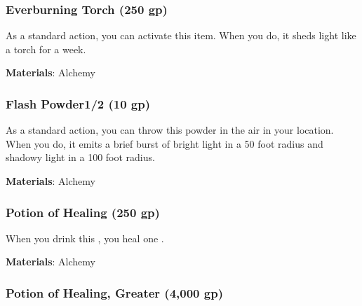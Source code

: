 \lowercase{\hypertarget{item:Everburning Torch}{}}\label{item:Everburning Torch}
\hypertarget{item:Everburning Torch}{\subsubsection{Everburning Torch\hfill{} (250 gp)}}

As a standard action, you can activate this item.
When you do, it sheds light like a torch for a week.



\vspace{0.25em}
\textbf{Materials}: Alchemy


\lowercase{\hypertarget{item:Flash Powder}{}}\label{item:Flash Powder}
\hypertarget{item:Flash Powder}{\subsubsection{Flash Powder\hfill1/2 (10 gp)}}

As a standard action, you can throw this powder in the air in your location.
When you do, it emits a brief burst of bright light in a 50 foot radius and shadowy light in a 100 foot radius.



\vspace{0.25em}
\textbf{Materials}: Alchemy


\lowercase{\hypertarget{item:Potion of Healing}{}}\label{item:Potion of Healing}
\hypertarget{item:Potion of Healing}{\subsubsection{Potion of Healing\hfill{} (250 gp)}}

When you drink this , you heal one .



\vspace{0.25em}
\textbf{Materials}: Alchemy


\lowercase{\hypertarget{item:Potion of Healing, Greater}{}}\label{item:Potion of Healing, Greater}
\hypertarget{item:Potion of Healing, Greater}{\subsubsection{Potion of Healing, Greater\hfill{} (4,000 gp)}}

